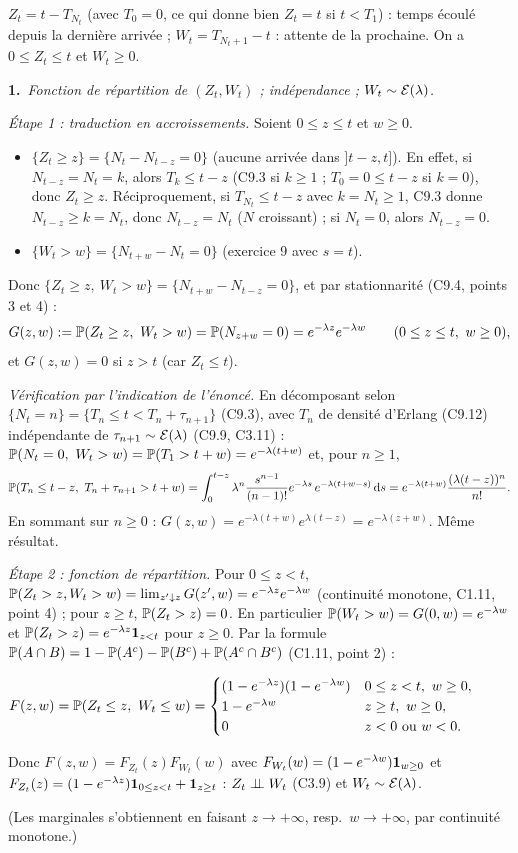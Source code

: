 \documentclass[11pt,a4paper]{article}
\newcommand{\question}[2]{\par\medskip\noindent\textbf{#1}~\textit{#2}\par\smallskip}
\begin{document}
\begin{exo}
$Z_t=t-T_{N_t}$ (avec $T_0=0$, ce qui donne bien $Z_t=t$ si $t<T_1$) : temps écoulé depuis la dernière arrivée ; $W_t=T_{N_t+1}-t$ : attente
de la prochaine. On a $0\le Z_t\le t$ et $W_t\ge0$.

\question{1.}{Fonction de répartition de $(Z_t,W_t)$ ; indépendance ; $W_t\sim\mathcal{E}(\lambda)$.}
\emph{Étape 1 : traduction en accroissements.} Soient $0\le z\le t$ et $w\ge0$.
\begin{itemize}
  \item $\{Z_t\ge z\}=\{N_t-N_{t-z}=0\}$ (aucune arrivée dans $]t-z,t]$). En effet, si $N_{t-z}=N_t=k$, alors $T_k\le t-z$ (C9.3 si $k\ge1$ ;
  $T_0=0\le t-z$ si $k=0$), donc $Z_t\ge z$. Réciproquement, si $T_{N_t}\le t-z$ avec $k=N_t\ge1$, C9.3 donne $N_{t-z}\ge k=N_t$, donc
  $N_{t-z}=N_t$ ($N$ croissant) ; si $N_t=0$, alors $N_{t-z}=0$.
  \item $\{W_t>w\}=\{N_{t+w}-N_t=0\}$ (exercice 9 avec $s=t$).
\end{itemize}
Donc $\{Z_t\ge z,\ W_t>w\}=\{N_{t+w}-N_{t-z}=0\}$, et par stationnarité (C9.4, points 3 et 4) :
\[G(z,w):=\PP(Z_t\ge z,\ W_t>w)=\PP(N_{z+w}=0)=e^{-\lambda z}e^{-\lambda w}\qquad(0\le z\le t,\ w\ge0),\]
et $G(z,w)=0$ si $z>t$ (car $Z_t\le t$).

\emph{Vérification par l'indication de l'énoncé.} En décomposant selon $\{N_t=n\}=\{T_n\le t<T_n+\tau_{n+1}\}$ (C9.3), avec $T_n$ de densité
d'Erlang (C9.12) indépendante de $\tau_{n+1}\sim\mathcal{E}(\lambda)$ (C9.9, C3.11) :
$\PP(N_t=0,\ W_t>w)=\PP(T_1>t+w)=e^{-\lambda(t+w)}$ et, pour $n\ge1$,
\[\PP(T_n\le t-z,\ T_n+\tau_{n+1}>t+w)=\int_0^{t-z}\lambda^n\frac{s^{n-1}}{(n-1)!}e^{-\lambda s}\,e^{-\lambda(t+w-s)}\dd s
=e^{-\lambda(t+w)}\frac{(\lambda(t-z))^n}{n!}.\]
En sommant sur $n\ge0$ : $G(z,w)=e^{-\lambda(t+w)}e^{\lambda(t-z)}=e^{-\lambda(z+w)}$. Même résultat.

\emph{Étape 2 : fonction de répartition.} Pour $0\le z<t$, $\mathbb{P}(Z_t>z,W_t>w)=\lim_{z'\downarrow z}G(z',w)=e^{-\lambda z}e^{-\lambda w}$ (continuité
monotone, C1.11, point 4) ; pour $z\ge t$, $\mathbb{P}(Z_t>z)=0$. En particulier $\mathbb{P}(W_t>w)=G(0,w)=e^{-\lambda w}$ et
$\mathbb{P}(Z_t>z)=e^{-\lambda z}\mathbf{1}_{z<t}$ pour $z\ge0$. Par la formule $\mathbb{P}(A\cap B)=1-\mathbb{P}(A^c)-\mathbb{P}(B^c)+\mathbb{P}(A^c\cap B^c)$ (C1.11, point 2) :
\begin{resultat}
$F(z,w)=\PP(Z_t\le z,\ W_t\le w)=\begin{cases}(1-e^{-\lambda z})(1-e^{-\lambda w}) & 0\le z<t,\ w\ge0,\\ 1-e^{-\lambda w} & z\ge t,\ w\ge0,\\ 0 & z<0\text{ ou }w<0.\end{cases}$
\par\smallskip
Donc $F(z,w)=F_{Z_t}(z)F_{W_t}(w)$ avec $F_{W_t}(w)=(1-e^{-\lambda w})\mathbf{1}_{w\ge0}$ et
$F_{Z_t}(z)=(1-e^{-\lambda z})\mathbf{1}_{0\le z<t}+\mathbf{1}_{z\ge t}$ : $Z_t\perp\!\!\!\perp W_t$ (C3.9) et $W_t\sim\mathcal{E}(\lambda)$.
\end{resultat}
(Les marginales s'obtiennent en faisant $z\to+\infty$, resp.\ $w\to+\infty$, par continuité monotone.)


\end{exo}
\end{document}

